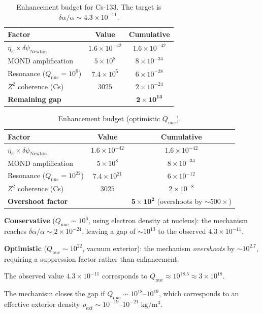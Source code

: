 \documentclass[aps,prd,twocolumn,superscriptaddress,nofootinbib]{revtex4-2}
\newcommand{\ee}[1]{\times 10^{#1}}
\newcommand{\kap}{\kappa}
\newcommand{\dpsi}{\delta\psi}
\newcommand{\dalpha}{\delta\alpha}
\newcommand{\Qnuc}{Q_{\mathrm{nuc}}}
\begin{document}
\begin{table}[h]
\centering
\caption{Enhancement budget for Cs-133.  The target is
$\dalpha/\alpha \sim 4.3\ee{-11}$.}
\label{tab:budget}
\renewcommand{\arraystretch}{1.3}
\begin{tabular}{lcc}
\toprule
\textbf{Factor} & \textbf{Value} & \textbf{Cumulative} \\
\midrule
$\eta_\kap \times \dpsi_{\mathrm{Newton}}$ & $1.6\ee{-42}$ & $1.6\ee{-42}$ \\
MOND amplification & $5\ee{8}$ & $8\ee{-34}$ \\
Resonance ($\Qnuc = 10^6$) & $7.4\ee{5}$ & $6\ee{-28}$ \\
$Z^2$ coherence (Cs) & $3025$ & $2\ee{-24}$ \\
\midrule
\textbf{Remaining gap} & & $\mathbf{2\ee{13}}$ \\
\bottomrule
\end{tabular}
\end{table}

\begin{table}[h]
\centering
\caption{Enhancement budget (optimistic $\Qnuc$).}
\label{tab:budget-opt}
\renewcommand{\arraystretch}{1.3}
\begin{tabular}{lcc}
\toprule
\textbf{Factor} & \textbf{Value} & \textbf{Cumulative} \\
\midrule
$\eta_\kap \times \dpsi_{\mathrm{Newton}}$ & $1.6\ee{-42}$ & $1.6\ee{-42}$ \\
MOND amplification & $5\ee{8}$ & $8\ee{-34}$ \\
Resonance ($\Qnuc = 10^{22}$) & $7.4\ee{21}$ & $6\ee{-12}$ \\
$Z^2$ coherence (Cs) & $3025$ & $2\ee{-8}$ \\
\midrule
\textbf{Overshoot factor} & & $\mathbf{5\ee{2}}$ (overshoots by $\sim\!500\times$) \\
\bottomrule
\end{tabular}
\end{table}

\begin{tcolorbox}[colback=blue!5!white, colframe=blue!50!black,
title=Summary of Magnitude Analysis]
\textbf{Conservative} ($\Qnuc \sim 10^6$, using electron density
at nucleus): the mechanism reaches $\dalpha/\alpha \sim 2\ee{-24}$,
leaving a gap of $\sim\!10^{13}$ to the observed $4.3\ee{-11}$.

\textbf{Optimistic} ($\Qnuc \sim 10^{22}$, vacuum exterior):
the mechanism \emph{overshoots} by $\sim\!10^{2.7}$, requiring a
suppression factor rather than enhancement.

The observed value $4.3\ee{-11}$ corresponds to $\Qnuc \approx
10^{18.5} \approx 3\ee{18}$.

The mechanism closes the gap if
$\Qnuc \sim 10^{18}$--$10^{19}$, which corresponds to an
effective exterior density $\rho_{\mathrm{ext}} \sim
10^{-19}$--$10^{-21}\;\mathrm{kg/m^3}$.
\end{tcolorbox}
\end{document}
